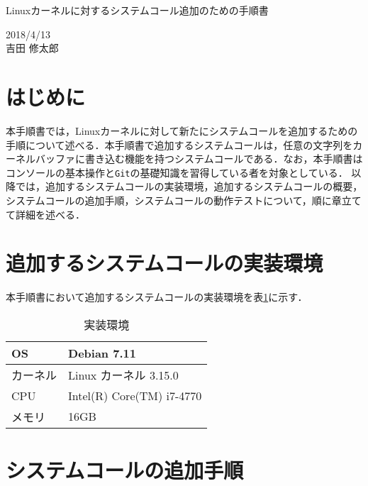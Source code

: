 \documentclass[12pt]{jsarticle}
\begin{document}
\begin{center}
  {\LARGE Linuxカーネルに対するシステムコール追加のための手順書}
\end{center}

\begin{flushright}
  2018/4/13\\
  吉田 修太郎
\end{flushright}
\section{はじめに}
本手順書では，Linuxカーネルに対して新たにシステムコールを追加するための手順について述べる．本手順書で追加するシステムコールは，任意の文字列をカーネルバッファに書き込む機能を持つシステムコールである．なお，本手順書はコンソールの基本操作と\verb|Git|の基礎知識を習得している者を対象としている．
以降では，追加するシステムコールの実装環境，追加するシステムコールの概要，システムコールの追加手順，システムコールの動作テストについて，順に章立てて詳細を述べる．

\section{追加するシステムコールの実装環境}\label{sec2}
本手順書において追加するシステムコールの実装環境を表\ref{table1}に示す．
\begin{table}[h!]
  \begin{center}
    \caption{実装環境}%
    \begin{tabular}{l|l}
      \hline\hline
      OS & Debian 7.11 \\
      \hline
      カーネル & Linux カーネル 3.15.0 \\
      \hline
      CPU & Intel(R) Core(TM) i7-4770 \\
      \hline
      メモリ & 16GB\\
      \hline
    \end{tabular}
    \label{table1}
  \end{center}
\end{table}

\section{システムコールの追加手順}
\end{document}
